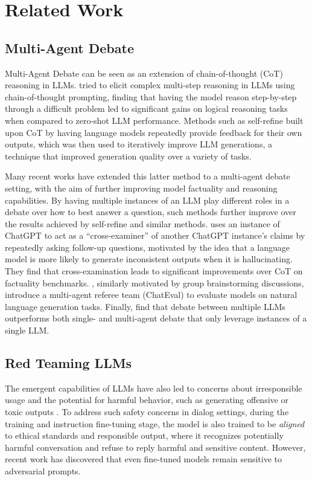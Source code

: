 \section{Related Work}

\subsection{Multi-Agent Debate}
Multi-Agent Debate can be seen as an extension of chain-of-thought (CoT) reasoning in LLMs. \citet{CoT} tried to elicit complex multi-step reasoning in LLMs using chain-of-thought prompting, finding that having the model reason step-by-step through a difficult problem led to significant gains on logical reasoning tasks when compared to zero-shot LLM performance. Methods such as self-refine \citep{madaan2023selfrefine} built upon CoT by having language models repeatedly provide feedback for their own outputs, which was then used to iteratively improve LLM generations, a technique that improved generation quality over a variety of tasks.

Many recent works have extended this latter method to a multi-agent debate setting, with the aim of further improving model factuality and reasoning capabilities. By having multiple instances of an LLM play different roles in a debate over how to best answer a question, such methods further improve over the results achieved by self-refine and similar methods. \citet{cohen2023lm} uses an instance of ChatGPT to act as a ``cross-examiner'' of another ChatGPT instance's claims by repeatedly asking follow-up questions, motivated by the idea that a language model is more likely to generate inconsistent outputs when it is hallucinating. They find that cross-examination leads to significant improvements over CoT on factuality benchmarks. \citet{chan2023chateval}, similarly motivated by group brainstorming discussions, introduce a multi-agent referee team (ChatEval) to evaluate models on natural language generation tasks. Finally, \citet{reconcile} find that debate between multiple LLMs outperforms both single- and multi-agent debate that only leverage instances of a single LLM.

\subsection{Red Teaming LLMs}
The emergent capabilities of LLMs have also led to concerns about irresponsible usage and the potential for harmful behavior, such as generating offensive or toxic outputs \citep{gehman2020}. To address such safety concerns in dialog settings, during the training and instruction fine-tuning stage, the model is also trained to be \textit{aligned} to ethical standards and responsible output, where it recognizes potentially harmful conversation and refuse to reply harmful and sensitive content. However, recent work has discovered that even fine-tuned models remain sensitive to adversarial prompts.

